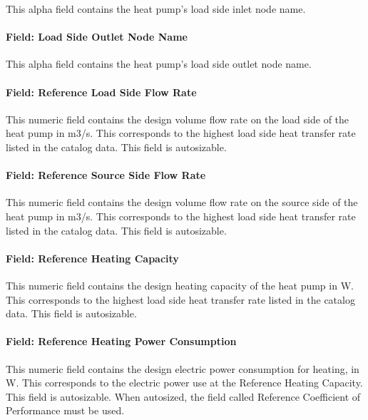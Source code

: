 This alpha field contains the heat pump's load side inlet node name.

\paragraph{Field: Load Side Outlet Node Name}\label{field-load-side-outlet-node-name-1}

This alpha field contains the heat pump's load side outlet node name.

\paragraph{Field: Reference Load Side Flow Rate}\label{field-rated-load-side-flow-rate-1}

This numeric field contains the design volume flow rate on the load side of the heat pump in m3/s. This corresponds to the highest load side heat transfer rate listed in the catalog data. This field is autosizable.

\paragraph{Field: Reference Source Side Flow Rate}\label{field-rated-source-side-flow-rate-1}

This numeric field contains the design volume flow rate on the source side of the heat pump in m3/s. This corresponds to the highest load side heat transfer rate listed in the catalog data. This field is autosizable.

\paragraph{Field: Reference Heating Capacity}\label{field-rated-heating-capacity-000}

This numeric field contains the design heating capacity of the heat pump in W. This corresponds to the highest load side heat transfer rate listed in the catalog data. This field is autosizable.

\paragraph{Field: Reference Heating Power Consumption}\label{field-rated-heating-power-consumption}

This numeric field contains the design electric power consumption for heating, in W. This corresponds to the electric power use at the Reference Heating Capacity. This field is autosizable. When autosized, the field called Reference Coefficient of Performance must be used.

